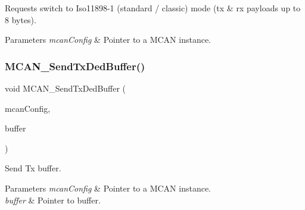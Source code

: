 Requests switch to Iso11898-\/1 (standard / classic) mode (tx \& rx payloads up to 8 bytes). 


\begin{DoxyParams}{Parameters}
{\em mcan\+Config} & Pointer to a M\+C\+AN instance. \\
\hline
\end{DoxyParams}
\mbox{\label{group__can__module_gab682df72e52163a4bbd6f89fe25a2459}} 
\subsubsection{\texorpdfstring{MCAN\_SendTxDedBuffer()}{MCAN\_SendTxDedBuffer()}}
{\footnotesize\ttfamily void M\+C\+A\+N\+\_\+\+Send\+Tx\+Ded\+Buffer (\begin{DoxyParamCaption}\item[{const \mbox{\hyperlink{structMCan__ConfigTag}{M\+Can\+\_\+\+Config\+Type}} $\ast$}]{mcan\+Config,  }\item[{uint8\+\_\+t}]{buffer }\end{DoxyParamCaption})}



Send Tx buffer. 


\begin{DoxyParams}{Parameters}
{\em mcan\+Config} & Pointer to a M\+C\+AN instance. \\
\hline
{\em buffer} & Pointer to buffer. \\
\hline
\end{DoxyParams}
